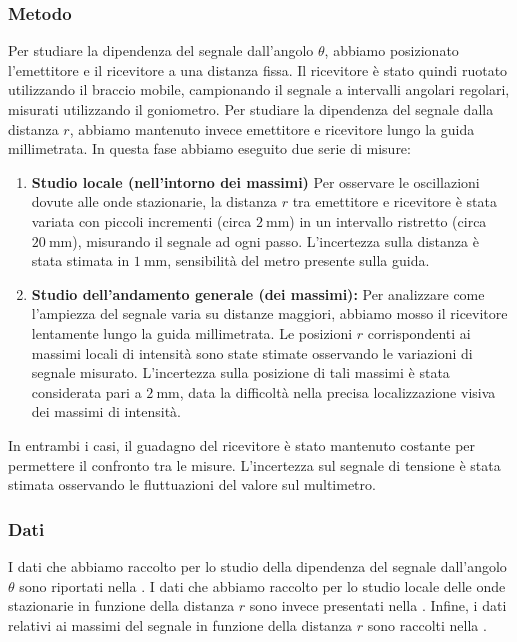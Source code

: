 \documentclass[a4paper]{article}
\begin{document}
\subsubsection{Metodo}
Per studiare la dipendenza del segnale dall'angolo $\theta$, abbiamo posizionato l'emettitore e il ricevitore a una distanza fissa. Il ricevitore è stato quindi ruotato utilizzando il braccio mobile, campionando il segnale a intervalli angolari regolari, misurati utilizzando il goniometro.
Per studiare la dipendenza del segnale dalla distanza $r$, abbiamo mantenuto invece emettitore e ricevitore lungo la guida millimetrata. In questa fase abbiamo eseguito due serie di misure:
\begin{enumerate}
    \item \textbf{Studio locale (nell'intorno dei massimi)} Per osservare le oscillazioni dovute alle onde stazionarie, la distanza $r$ tra emettitore e ricevitore è stata variata con piccoli incrementi (circa $\SI{2}{\milli\metre}$) in un intervallo ristretto (circa $\SI{20}{\milli\metre}$), misurando il segnale ad ogni passo. L'incertezza sulla distanza è stata stimata in $\SI{1}{\milli\metre}$, sensibilità del metro presente sulla guida.
    
    \item \textbf{Studio dell'andamento generale (dei massimi):} Per analizzare come l'ampiezza del segnale varia su distanze maggiori, abbiamo mosso il ricevitore lentamente lungo la guida millimetrata. Le posizioni $r$ corrispondenti ai massimi locali di intensità sono state stimate osservando le variazioni di segnale misurato. L'incertezza sulla posizione di tali massimi è stata considerata pari a $\SI{2}{\milli\metre}$, data la difficoltà nella precisa localizzazione visiva dei massimi di intensità.
    
\end{enumerate}
In entrambi i casi, il guadagno del ricevitore è stato mantenuto costante per permettere il confronto tra le misure. L'incertezza sul segnale di tensione è stata stimata osservando le fluttuazioni del valore sul multimetro.

\subsubsection{Dati}
I dati che abbiamo raccolto per lo studio della dipendenza del segnale dall'angolo $\theta$ sono riportati nella .
I dati che abbiamo raccolto per lo studio locale delle onde stazionarie in funzione della distanza $r$ sono invece presentati nella .
Infine, i dati relativi ai massimi del segnale in funzione della distanza $r$ sono raccolti nella .
\end{document}
